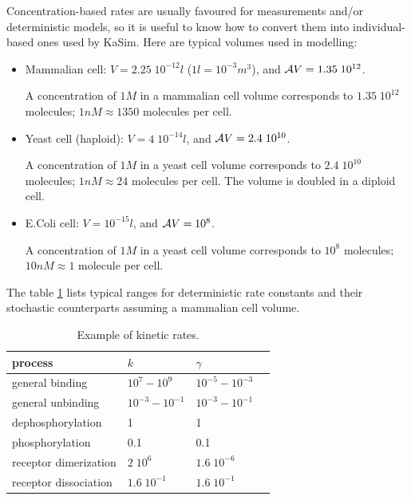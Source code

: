 \documentclass[11pt]{book}
\begin{document}
Concentration-based rates are usually favoured for measurements and/or deterministic models, so it is useful to know how to convert them into
individual-based ones used by KaSim.
Here are typical volumes used in modelling:
\begin{itemize}
\item Mammalian cell: $V=2.25\; 10^{-12}l$  ($1l=10^{-3}m^3$), and ${\cal A}V=1.35\; 10^{12}$.

A concentration of $1M$ in a mammalian cell volume corresponds to $1.35\; 10^{12}$ molecules; $1nM\approx 1350$ molecules per cell.

\item
Yeast cell (haploid): $V=4\; 10^{-14}l$, and ${\cal A}V=2.4\; 10^{10}$.

A concentration of $1M$ in a yeast cell volume corresponds to $2.4\; 10^{10}$ molecules; $1nM\approx 24$ molecules per cell. The volume is doubled in a diploid cell.
\item
E.\@ Coli cell: $V=10^{-15}l$, and ${\cal A}V=10^{8}$.

A concentration of $1M$ in a yeast cell volume corresponds to $10^{8}$ molecules; $10nM\approx 1$ molecule per cell.
\end{itemize}

The table \ref{tab:kin_rates} lists typical ranges for deterministic rate constants and
their stochastic counterparts assuming a mammalian cell volume.

\begin{table}[htbp]
\centering
\caption{Example of kinetic rates.}
\label{tab:kin_rates}
\begin{tabular}{@{} lllr @{} }
\toprule
process & $k$ & $\gamma$ %
\\
\midrule
general binding & $10^{7}-10^{9}$ & $10^{-5}-10^{-3}$ %
\\
general unbinding &  $10^{-3} - 10^{-1}$ & $10^{-3}-10^{-1}$ %
\\
dephosphorylation & 1 & 1 %
\\
phosphorylation & 0.1 & 0.1 %
\\
receptor dimerization & $2\; 10^{6}$ & $1.6 \;10^{-6}$ %
\\
receptor dissociation & $1.6\; 10^{-1}$ & $1.6\; 10^{-1}$ %
\\
\bottomrule
\end{tabular}
\end{table}
\end{document}
